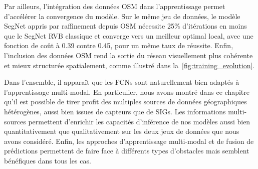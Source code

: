 Par ailleurs, l'intégration des données \gls{OSM} dans l'apprentissage permet d'accélérer la convergence du modèle. Sur le même jeu de données, le modèle SegNet appris par raffinement depuis \gls{OSM} nécessite 25\% d'itérations en moins que le SegNet \gls{RVB} classique et converge vers un meilleur optimal local, avec une fonction de coût à \num{0,39} contre \num{0,45}, pour un même taux de réussite. Enfin, l'inclusion des données \gls{OSM} rend la sortie du réseau visuellement plus cohérente et mieux structurée spatialement, comme illustré dans la~\cref{fig:training_evolution}.

Dans l'ensemble, il apparaît que les \glspl{FCN} sont naturellement bien adaptés à l'apprentissage multi-modal. En particulier, nous avons montré dans ce chapitre qu'il est possible de tirer profit des multiples sources de données géographiques hétérogènes, aussi bien issues de capteurs que de \glspl{SIG}. Les informations multi-sources permettent d'enrichir les capacités d'inférence de nos modèles aussi bien quantitativement que qualitativement sur les deux jeux de données que nous avons considéré. Enfin, les approches d'apprentissage multi-modal et de fusion de prédictions permettent de faire face à différents types d'obstacles mais semblent bénéfiques dans tous les cas.
%
%
\printbibliography[heading=subbibliography]
